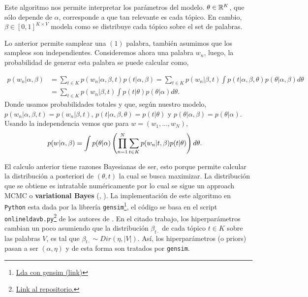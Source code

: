 \documentclass{article}
\begin{document}
	\begin{remark}
		Este algoritmo nos permite interpretar los parámetros del modelo. $\theta\in\mathbb{R}^{K}$, que sólo depende de $\alpha$, corresponde a que tan relevante es cada tópico. En cambio, $\beta\in[0,1]^{K\times V}$ modela como se distribuye cada tópico sobre el set de palabras. 
	\end{remark}
	
	Lo anterior permite samplear una $(1)$ palabra, también asumimos que los sampleos son independientes. Consideremos ahora una palabra $w_n$, luego, la probabilidad de generar esta palabra se puede calcular como,
	
	\begin{align*}
		p(w_n|\alpha, \beta) &= \sum_{t\in K} p(w_n|\alpha,\beta,t)p(t|\alpha,\beta)
		= \sum_{t\in K} p(w_n|\beta,t)\int p(t|\alpha,\beta,\theta)p(\theta|\alpha,\beta)d\theta\\
		&= \sum_{t\in K} p(w_n|\beta,t)\int p(t|\theta)p(\theta|\alpha)d\theta.
	\end{align*}
	Donde usamos probabilidades totales y que, según nuestro modelo, $p(w_n|\alpha,\beta,t)=p(w_n|\beta,t)$, $p(t|\alpha,\beta,\theta)=p(t|\theta)$ y $p(\theta|\alpha,\beta)=p(\theta|\alpha)$. Usando la independencia vemos que para $w=(w_1,...,w_N)$,  
	\begin{align*}
		p(w|\alpha,\beta) &= \int p(\theta|\alpha)\left(\prod_{n=1}^N \sum_{t\in K} p(w_n|t,\beta)p(t|\theta)\right) d\theta.
	\end{align*}
	
	El calculo anterior tiene razones Bayesianas de ser, esto porque permite calcular la distribución a posteriori de $(\theta, t)$ la cual se busca maximizar. La distribución que se obtiene es intratable numéricamente por lo cual se sigue un approach MCMC o \textbf{variational Bayes}  (\cite{LDA03}, \cite{LDA10}). La implementación de este algoritmo en \texttt{Python} esta dada por la librería \texttt{gensim}\footnote{\href{https://radimrehurek.com/gensim/models/ldamodel.html}{Lda con gensim (link)}}, el código se basa en el script \texttt{onlineldavb.py}\footnote{\href{https://github.com/blei-lab/onlineldavb/blob/master/onlineldavb.py}{Link al repositorio.}} de los autores de \cite{LDA10}. En el citado trabajo, los hiperparámetros cambian un poco asumiendo que la distribución $\beta_{t\cdot}$ de cada tópico $t\in K$ sobre las palabras $V$, es tal que $\beta_{t\cdot}\sim Dir(\eta, |V|)$. Así, los hiperparámetros (o priors) pasan a ser $(\alpha,\eta)$ y de esta forma son tratados por \texttt{gensim}.\\ 
	
\end{document}
